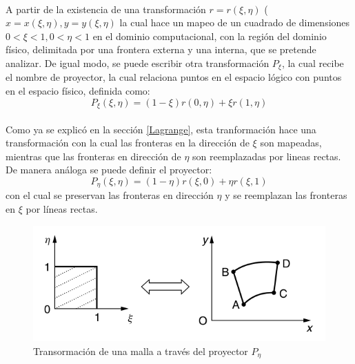 \documentclass[letterpaper, openright, 12pt]{book}
\begin{document}
    \paragraph*{}
        A partir de la existencia de una transformación $r = r(\xi, \eta)$
        ($x = x(\xi, \eta), y = y(\xi, \eta)$ la cual hace un mapeo de un
        cuadrado de dimensiones $0 < \xi < 1, 0 < \eta < 1$ en el dominio
        computacional, con la región del dominio físico, delimitada por una
        frontera externa y una interna, que se pretende analizar.
        De igual modo, se puede escribir otra transformación $P_{\xi}$,
        la cual recibe el nombre de proyector, la cual relaciona puntos en el
        espacio lógico con puntos en el espacio físico, definida como:
        \begin{equation}
            P_{\xi}(\xi, \eta) = (1 - \xi)r(0, \eta) + \xi r(1, \eta)
        \end{equation}
    \paragraph*{}
        Como ya se explicó en la sección \ref{Lagrange}, esta tranformación hace
        una transformación con la cual las fronteras en la dirección de $\xi$
        son mapeadas, mientras que las fronteras en dirección de $\eta$ son
        reemplazadas por lineas rectas. De manera análoga se puede definir el
        proyector:
        \begin{equation}
            P_{\eta}(\xi, \eta) = (1 - \eta)r(\xi, 0) + \eta r(\xi, 1)
        \end{equation}
        con el cual se preservan las fronteras en dirección $\eta$ y se
        reemplazan las fronteras en $\xi$ por líneas rectas.
        \begin{figure}[htbp!]
            \centering
            \includegraphics[keepaspectratio, width=120mm]{./Imagenes/mapeo_eta}
            \caption[Transformación de malla por $P_{\eta}$]{Transormación de
            una malla a través del proyector $P_{\eta}$ \cite{farrashkhalvat}}
            \label{fig:mapeo_eta}
        \end{figure}
\end{document}
